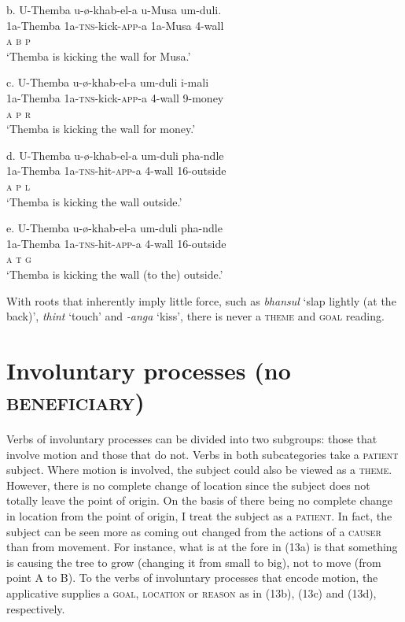 \gll   b.  U-Themba    u-ø-khab-el-a           u-Musa  um-duli. \\
         1a-Themba   1a-\textsc{tns}{}-kick-\textsc{app}{}-a    1a-Musa  4-wall\\
         \textsc{a                    b      p}\\
\glt     ‘Themba is kicking the wall for Musa.’
\z

\gll   c.  U-Themba    u-ø-khab-el-a       um-duli   i-mali\\
         1a-Themba   1a-\textsc{tns}{}-kick-\textsc{app}{}-a   4-wall    9-money\\
         \textsc{a                    p      r}\\
\glt     ‘Themba is kicking the wall for money.’
\z

\gll   d.  U-Themba    u-ø-khab-el-a      um-duli  pha-ndle \\
         1a-Themba  1a-\textsc{tns}{}-hit-\textsc{app}{}-a    4-wall    16-outside\\
         \textsc{a                         p         l}\\
\glt     ‘Themba is kicking the wall outside.’
\z

\gll   e.  U-Themba    u-ø-khab-el-a      um-duli   pha-ndle \\
         1a-Themba  1a-\textsc{tns}{}-hit-\textsc{app}{}-a    4-wall    16-outside\\
         \textsc{a                         t         g}\\
\glt     ‘Themba is kicking the wall (to the) outside.’
\z

With roots that inherently imply little force, such as \textit{bhansul} ‘slap lightly (at the back)’, \textit{thint} ‘touch’ and \textit{{}-anga} ‘kiss’, there is never a \textsc{theme }and \textsc{goal} reading.

\section{Involuntary processes (no \textsc{beneficiary})}

Verbs of involuntary processes can be divided into two subgroups: those that involve motion and those that do not. Verbs in both subcategories take a \textsc{patient} subject. Where motion is involved, the subject could also be viewed as a \textsc{theme}. However, there is no complete change of location since the subject does not totally leave the point of origin. On the basis of there being no complete change in location from the point of origin, I treat the subject as a \textsc{patient}. In fact, the subject can be seen more as coming out changed from the actions of a \textsc{causer} than from movement. For instance, what is at the fore in (13a) is that something is causing the tree to grow (changing it from small to big), not to move (from point A to B). To the verbs of involuntary processes that encode motion, the applicative supplies a \textsc{goal}, \textsc{location} or \textsc{reason} as in (13b), (13c) and (13d), respectively.

